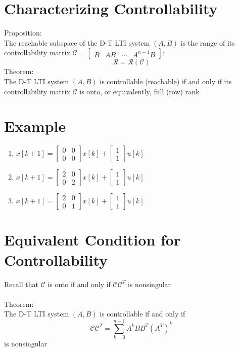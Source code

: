 \documentclass[10pt,a4paper,oneside]{article}
\begin{document}
\section{Characterizing Controllability}
Proposition:\\
The reachable subspace of the D-T LTI system $(A,B)$ is the range of its controllability matrix  $\mathcal{C}=\left[\begin{array}{llll}{B} & {A B} & {\cdots} & {A^{n-1} B}\end{array}\right]$:
\[
\mathcal{R}=\mathcal{R}(\mathcal{C})
\]
Theorem:\\
The D-T LTI system $(A,B)$ is controllable (reachable) if and only if its controllability matrix $\mathcal{C}$ is onto, or equivalently, full (row) rank
\section{Example}
\begin{enumerate}
\item $x[k+1]=\left[\begin{array}{ll}{0} & {0} \\ {0} & {0}\end{array}\right] x[k]+\left[\begin{array}{l}{1} \\ {1}\end{array}\right] u[k]$
\item $x[k+1]=\left[\begin{array}{ll}{2} & {0} \\ {0} & {2}\end{array}\right] x[k]+\left[\begin{array}{l}{1} \\ {1}\end{array}\right] u[k]$
\item $x[k+1]=\left[\begin{array}{ll}{2} & {0} \\ {0} & {1}\end{array}\right] x[k]+\left[\begin{array}{l}{1} \\ {1}\end{array}\right] u[k]$
\end{enumerate}
\section{Equivalent Condition for Controllability}
Recall that $\mathcal{C}$ is onto if and only if $\mathcal{CC}^T$ is nonsingular\\
\\
Theorem:\\
The D-T LTI system $(A,B)$ is controllable if and only if 
\[
\mathcal{C C}^{T}=\sum_{k=0}^{n-1} A^{k} B B^{T}\left(A^{T}\right)^{k}
\]
is nonsingular
\end{document}
